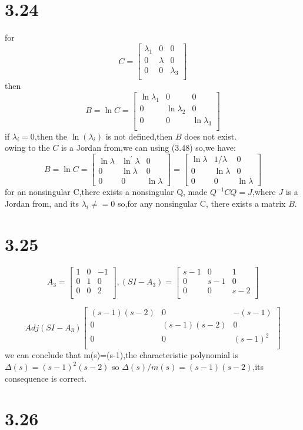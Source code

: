 \documentclass{article}
\begin{document}
\section*{3.24}
for
\[C=
\left[
\begin{array}{ccc}
\lambda_1 & 0 & 0\\
0 & \lambda & 0\\
0 & 0 & \lambda_3\\
\end{array}
\right]
\]
then
\[B=\ln{C}=
\left[
\begin{array}{ccc}
\ln{\lambda_1} & 0 & 0\\
0 & \ln{\lambda_2} & 0\\
0 & 0 & \ln{\lambda_3}\\
\end{array}
\right]
\]
if $\lambda_i=0$,then the $\ln(\lambda_i)$ is not defined,then $B$ does not exist.\\
owing to the $C$ is a Jordan from,we can using (3.48)
so,we have:
\[
B=\ln C=\left[\begin{array}{ccc}
\ln \lambda & \ln ^{\prime} \lambda & 0 \\
0 & \ln \lambda & 0 \\
0 & 0 & \ln \lambda
\end{array}\right]=\left[\begin{array}{ccc}
\ln \lambda & 1 / \lambda & 0 \\
0 & \ln \lambda & 0 \\
0 & 0 & \ln \lambda
\end{array}\right]   
\]
for an nonsingular C,there exists a nonsingular Q,
made $Q^{-1}CQ=J$,where $J$ is a Jordan from, and its $\lambda_i \neq=0$ 
so,for any nonsingular C, there exists a matrix $B$.

\section*{3.25}
\[A_3=
\left[
\begin{array}{ccc}
1 & 0 & -1\\
0 & 1 & 0\\
0 & 0 & 2\\
\end{array}
\right],
(SI-A_3)=
\left[
\begin{array}{ccc}
s-1 & 0 & 1\\
0 & s-1 & 0\\
0 & 0 & s-2\\
\end{array}
\right]
\]

\[
Adj(SI-A_3)  
\left[
\begin{array}{ccc}
(s-1)(s-2) & 0 & -(s-1)\\
0 & (s-1)(s-2) & 0\\
0 & 0 & (s-1)^2\\
\end{array}
\right]
\]
we can conclude that m(s)=(s-1),the characteristic polynomial is$\Delta(s)=(s-1)^2(s-2)$
so $\Delta(s)/m(s)=(s-1)(s-2)$,its consequence is correct.


\section*{3.26}
\end{document}
